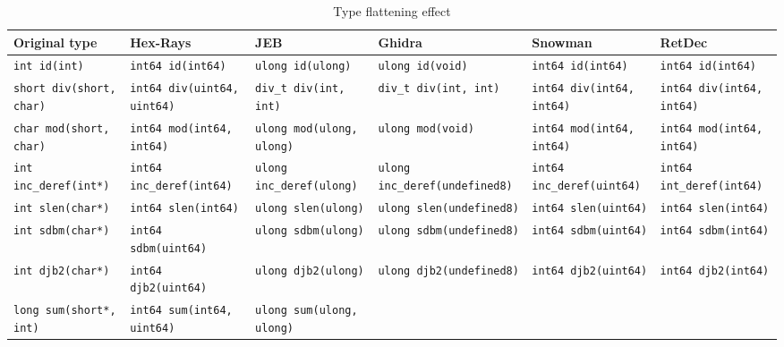 \documentclass[compsoc,conference,a4paper,10pt,times]{IEEEtran}
\begin{document}
\begin{sidewaystable}[ht]
        \caption{Type flattening effect}\label{flattening}
        \centering
        \scriptsize
        \begin{tabular}{|l|l|l|l|l|l|}
          \hline
          Original type & Hex-Rays & JEB & Ghidra & Snowman & RetDec \\
          \hline
          \texttt{int id(int)} & \texttt{int64 id(int64)} & \texttt{ulong id(ulong)} &
          \texttt{ulong id(void)} & \texttt{int64 id(int64)} & \texttt{int64 id(int64)} \\
          \hline
          \texttt{short div(short, char)} & \texttt{int64 div(uint64, uint64)} & \texttt{div\_t div(int, int)} &
          \texttt{div\_t div(int, int)} & \texttt{int64 div(int64, int64)} & \texttt{int64 div(int64, int64)} \\
          \hline
          \texttt{char mod(short, char)} & \texttt{int64 mod(int64, int64)} & \texttt{ulong mod(ulong, ulong)} &
          \texttt{ulong mod(void)} & \texttt{int64 mod(int64, int64)} & \texttt{int64 mod(int64, int64)} \\
          \hline
          \texttt{int inc\_deref(int*)} & \texttt{int64 inc\_deref(int64)} & \texttt{ulong inc\_deref(ulong)} &
          \texttt{ulong inc\_deref(undefined8)} & \texttt{int64 inc\_deref(uint64)} & \texttt{int64 int\_deref(int64)} \\
          \hline
          \texttt{int slen(char*)} & \texttt{int64 slen(int64)} & \texttt{ulong slen(ulong)} &
          \texttt{ulong slen(undefined8)} & \texttt{int64 slen(uint64)} & \texttt{int64 slen(int64)}\\
          \hline
          \texttt{int sdbm(char*)} & \texttt{int64 sdbm(uint64)} & \texttt{ulong sdbm(ulong)} &
          \texttt{ulong sdbm(undefined8)} & \texttt{int64 sdbm(uint64)} & \texttt{int64 sdbm(int64)} \\
          \hline
          \texttt{int djb2(char*)} & \texttt{int64 djb2(uint64)} & \texttt{ulong djb2(ulong)} &
          \texttt{ulong djb2(undefined8)} & \texttt{int64 djb2(uint64)} & \texttt{int64 djb2(int64)} \\
          \hline
          \texttt{long sum(short*, int)} & \texttt{int64 sum(int64, uint64)} & \texttt{ulong sum(ulong, ulong)} &

\end{tabular}
\end{sidewaystable}
\end{document}
